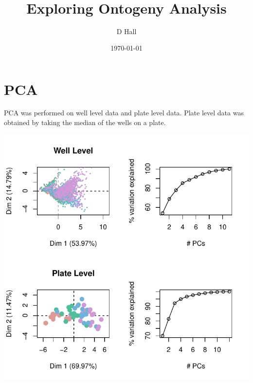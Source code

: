 \documentclass{article}\usepackage[]{graphicx}\usepackage[]{color}
\makeatletter
\def\maxwidth{ %
  \ifdim\Gin@nat@width>\linewidth
    \linewidth
  \else
    \Gin@nat@width
  \fi
}
\newenvironment{knitrout}{}{} %
\makeatother
\begin{document}
\onehalfspacing
\title{ Exploring Ontogeny Analysis }

\author{D Hall}
\date{\today}

\maketitle










\section*{PCA}
PCA was performed on well level data and plate level data. Plate level data was obtained by taking the median of the wells on a plate. 

\begin{knitrout}
\color{fgcolor}

{\centering \includegraphics[width=\maxwidth]{figure/graphics-pca1-1} 

}



\end{knitrout}
\end{document}
